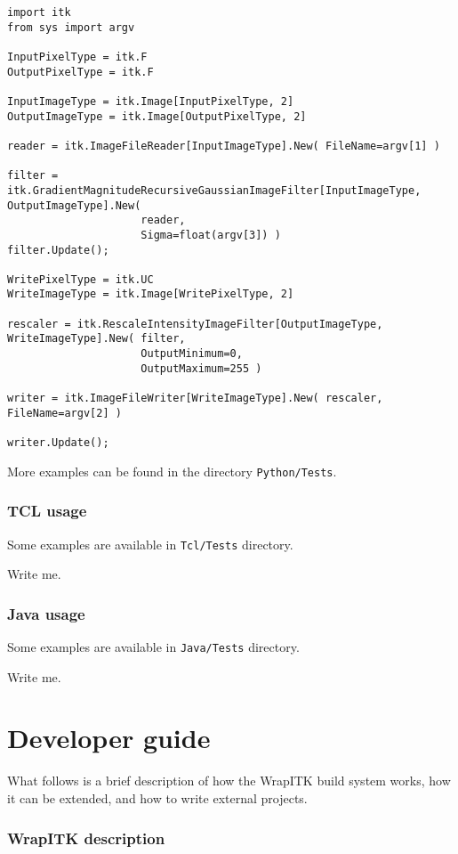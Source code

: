 \documentclass{InsightArticle}
\begin{document}
\small \begin{verbatim}
import itk
from sys import argv

InputPixelType = itk.F
OutputPixelType = itk.F

InputImageType = itk.Image[InputPixelType, 2]
OutputImageType = itk.Image[OutputPixelType, 2]

reader = itk.ImageFileReader[InputImageType].New( FileName=argv[1] )

filter = itk.GradientMagnitudeRecursiveGaussianImageFilter[InputImageType, OutputImageType].New(
                     reader,
                     Sigma=float(argv[3]) )
filter.Update();

WritePixelType = itk.UC
WriteImageType = itk.Image[WritePixelType, 2]

rescaler = itk.RescaleIntensityImageFilter[OutputImageType, WriteImageType].New( filter,
                     OutputMinimum=0,
                     OutputMaximum=255 )

writer = itk.ImageFileWriter[WriteImageType].New( rescaler, FileName=argv[2] )

writer.Update();
\end{verbatim} \normalsize

More examples can be found in the directory \verb$Python/Tests$.

    \section{TCL usage}

Some examples are available in \verb$Tcl/Tests$ directory.

Write me.

    \section{Java usage}

Some examples are available in \verb$Java/Tests$ directory.

Write me.

\newpage
\part{Developer guide}

What follows is a brief description of how the WrapITK build system works, how
it can be extended, and how to write external projects.

  \section{WrapITK description}
\end{document}
